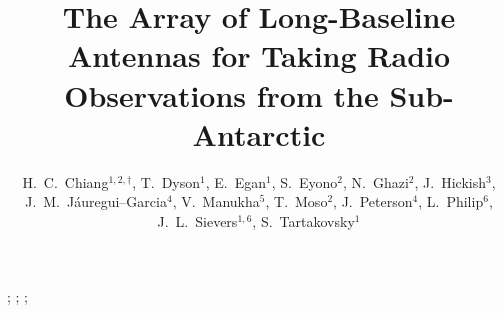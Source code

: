 \documentclass{ws-jai}
\begin{document}
\catchline{}{}{}{}{} %


\title{The Array of Long-Baseline Antennas for Taking Radio
  Observations from the Sub-Antarctic}

\author{H.~C.~Chiang$^{1,2,\dagger}$, T.~Dyson$^{1}$, E.~Egan$^{1}$,
  S.~Eyono$^{2}$, N.~Ghazi$^{2}$, J.~Hickish$^{3}$,
  J.~M.~J\'auregui--Garcia$^{4}$, V.~Manukha$^{5}$, T.~Moso$^{2}$,
  J.~Peterson$^{4}$, L.~Philip$^{6}$, J.~L.~Sievers$^{1,6}$,
  S.~Tartakovsky$^{1}$}

\address{
$^{1}$Department of Physics, McGill University, Montr\'eal, Quebec H3A 2T8, Canada\\
$^{2}$School of Mathematics, Statistics, and Computer Science,
  University of KwaZulu--Natal, Durban 4000, South Africa\\
$^{3}$Department of Astronomy, University of California, Berkeley,
  California 94720, USA\\
$^{4}$Department of Physics, Carnegie Mellon University,
  Pittsburgh, Pennsylvania 15213, USA\\
$^{5}$South African National Space Agency, Hermanus 7200, South Africa\\
$^{6}$School of Chemistry and Physics,
  University of KwaZulu--Natal, Durban 4000, South Africa
}

\maketitle


\begin{history}
;
;
;
\end{history}
\end{document}
